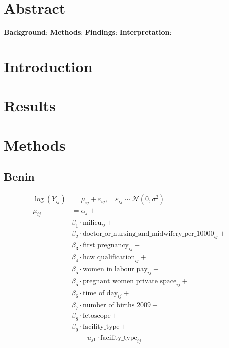 \documentclass{article}
\date{}
\begin{document}
\vspace*{0.2in}


\title{}
\maketitle
\section*{Abstract}
\textbf{Background}: 
\textbf{Methods}:
\textbf{Findings}: 
\textbf{Interpretation}: 

\section*{Introduction}
\section{Results}
\section{Methods}

\subsection{Benin}
\begin{align*}
  \log(Y_{ij}) &= \mu_{ij} + \varepsilon_{ij}, \quad \varepsilon_{ij} \sim \mathcal{N}(0, \sigma^2) \\
  \mu_{ij} &= \alpha_j + \\
  & \beta_1 \cdot \text{milieu}_{ij} + \\
  & \beta_2 \cdot \text{doctor\_or\_nursing\_and\_midwifery\_per\_10000}_{ij} + \\
  & \beta_3 \cdot \text{first\_pregnancy}_{ij} + \\
  & \beta_4 \cdot \text{hcw\_qualification}_{ij} + \\
  & \beta_5 \cdot \text{women\_in\_labour\_pay}_{ij} + \\
  & \beta_5 \cdot \text{pregnant\_women\_private\_space}_{ij} + \\
  & \beta_6 \cdot \text{time\_of\_day}_{ij} + \\
  & \beta_7 \cdot \text{number\_of\_births\_2009} + \\
  & \beta_8 \cdot \text{fetoscope} + \\
  & \beta_9 \cdot \text{facility\_type} + \\
  &\quad + u_{j1} \cdot \text{facility\_type}_{ij}  \\
\end{align*}
\end{document}

